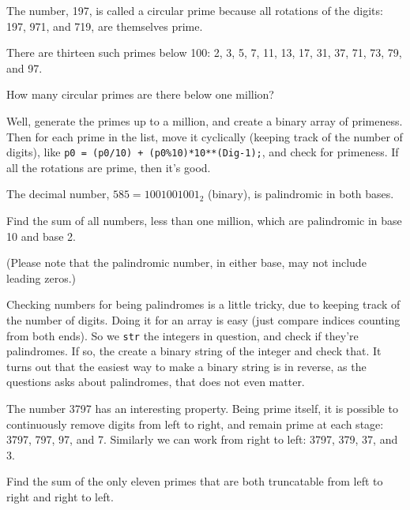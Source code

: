 


The number, 197, is called a circular prime because all rotations of the digits: 197, 971, and 719, are themselves prime.

There are thirteen such primes below 100: 2, 3, 5, 7, 11, 13, 17, 31, 37, 71, 73, 79, and 97.

How many circular primes are there below one million?

Well, generate the primes up to a million, and create a binary array of primeness.  Then for each prime in the list,
move it cyclically (keeping track of the number of digits), like \verb"p0 = (p0/10) + (p0%10)*10**(Dig-1);", and check for primeness.  If all the rotations are prime, then it's good.





The decimal number, $585 = 1001001001_2$ (binary), is palindromic in both bases.

Find the sum of all numbers, less than one million, which are palindromic in base 10 and base 2.

\footnotesize
(Please note that the palindromic number, in either base, may not include leading zeros.)
\normalsize

Checking numbers for being palindromes is a little tricky, due to keeping track of the number of digits.
Doing it for an array is easy (just compare indices counting from both ends).  So we \verb"str" the integers in question,
and check if they're palindromes.  If so, the create a binary string of the integer and check that.  It turns out that
the easiest way to make a binary string is in reverse, as the questions asks about palindromes, that does not even matter.




The number 3797 has an interesting property. Being prime itself, it is possible to continuously remove digits from left to right, and remain prime at each stage: 3797, 797, 97, and 7. Similarly we can work from right to left: 3797, 379, 37, and 3.

Find the sum of the only eleven primes that are both truncatable from left to right and right to left.

